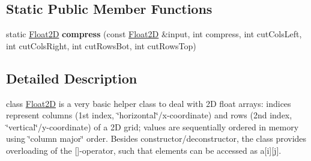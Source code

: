 \subsection*{Static Public Member Functions}
\begin{DoxyCompactItemize}
\item 
\hypertarget{classFloat2D_a7484b254a7c4206e3bc75572397c2d51}{static \hyperlink{classFloat2D}{Float2\-D} {\bfseries compress} (const \hyperlink{classFloat2D}{Float2\-D} \&input, int compress, int cut\-Cols\-Left, int cut\-Cols\-Right, int cut\-Rows\-Bot, int cut\-Rows\-Top)}\label{classFloat2D_a7484b254a7c4206e3bc75572397c2d51}

\end{DoxyCompactItemize}


\subsection{Detailed Description}
class \hyperlink{classFloat2D}{Float2\-D} is a very basic helper class to deal with 2\-D float arrays\-: indices represent columns (1st index, \char`\"{}horizontal\char`\"{}/x-\/coordinate) and rows (2nd index, \char`\"{}vertical\char`\"{}/y-\/coordinate) of a 2\-D grid; values are sequentially ordered in memory using \char`\"{}column major\char`\"{} order. Besides constructor/deconstructor, the class provides overloading of the \mbox{[}\mbox{]}-\/operator, such that elements can be accessed as a\mbox{[}i\mbox{]}\mbox{[}j\mbox{]}. 

